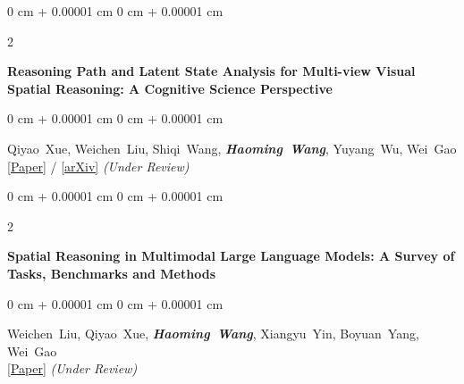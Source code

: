 \documentclass[10pt, letterpaper]{article}
\newenvironment{onecolentry}{
    \begin{adjustwidth}{
        0 cm + 0.00001 cm
    }{
        0 cm + 0.00001 cm
    }
}{
    \end{adjustwidth}
} %
\newenvironment{twocolentry}[2][]{
    \onecolentry
    \def\secondColumn{#2}
    \setcolumnwidth{\fill, 4.5 cm}
    \begin{paracol}{2}
}{
    \switchcolumn \raggedleft \secondColumn
    \end{paracol}
    \endonecolentry
} %
\let\hrefWithoutArrow\href
\begin{document}
\begin{samepage}
            \vspace{0.3 cm}

            \begin{twocolentry}{
                2026
            }
                \textbf{Reasoning Path and Latent State Analysis for Multi-view Visual Spatial Reasoning: A Cognitive Science Perspective}
            \end{twocolentry}
            \vspace{0.10 cm}
            \begin{onecolentry}
                \mbox{Qiyao Xue}, \mbox{Weichen Liu}, \mbox{Shiqi Wang}, \mbox{\textbf{\textit{Haoming Wang}}}, \mbox{Yuyang Wu}, \mbox{Wei Gao}
                \vspace{0.10 cm}
                \\ \hrefWithoutArrow{#}{[Paper]} / \hrefWithoutArrow{#}{[arXiv]} \textit{(Under Review)}
            \end{onecolentry}
            
            \vspace{0.3 cm}

            \begin{twocolentry}{
                2026
            }
                \textbf{Spatial Reasoning in Multimodal Large Language Models: A Survey of Tasks, Benchmarks and Methods}
            \end{twocolentry}
            \vspace{0.10 cm}
            \begin{onecolentry}
                \mbox{Weichen Liu}, \mbox{Qiyao Xue}, \mbox{\textbf{\textit{Haoming Wang}}}, \mbox{Xiangyu Yin}, \mbox{Boyuan Yang}, \mbox{Wei Gao}
                \vspace{0.10 cm}
                \\ \hrefWithoutArrow{#}{[Paper]} \textit{(Under Review)}
            \end{onecolentry}
        
        \end{samepage}
        
\end{document}
